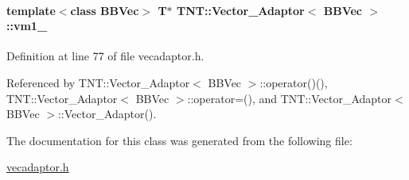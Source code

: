 \paragraph[{vm1\_\-}]{\setlength{\rightskip}{0pt plus 5cm}template$<$class BBVec$>$ {\bf T}$\ast$ {\bf TNT::Vector\_\-Adaptor}$<$ BBVec $>$::{\bf vm1\_\-}}\hfill\label{class_t_n_t_1_1_vector___adaptor_ae5ca6c14a440c4bcddb0d9114222d946}


Definition at line 77 of file vecadaptor.h.



Referenced by TNT::Vector\_\-Adaptor$<$ BBVec $>$::operator()(), TNT::Vector\_\-Adaptor$<$ BBVec $>$::operator=(), and TNT::Vector\_\-Adaptor$<$ BBVec $>$::Vector\_\-Adaptor().



The documentation for this class was generated from the following file:\begin{DoxyCompactItemize}
\item 
\hyperlink{vecadaptor_8h}{vecadaptor.h}\end{DoxyCompactItemize}
